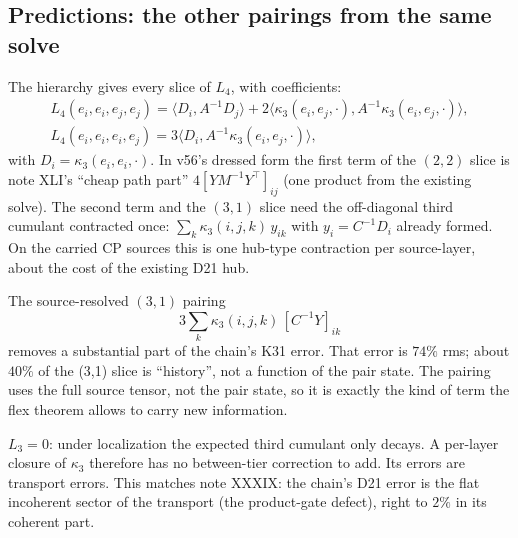 \subsection{Predictions: the other pairings from the same solve}
The hierarchy gives every slice of $L_4$, with coefficients:
\begin{gather*}
L_4(e_i,e_i,e_j,e_j)=\langle D_i,A^{-1}D_j\rangle+2\langle\kappa_3(e_i,e_j,\cdot),A^{-1}\kappa_3(e_i,e_j,\cdot)\rangle,\\
L_4(e_i,e_i,e_i,e_j)=3\langle D_i,A^{-1}\kappa_3(e_i,e_j,\cdot)\rangle,
\end{gather*}
with $D_i=\kappa_3(e_i,e_i,\cdot)$. In v56's dressed form the first term of the $(2,2)$ slice is note XLI's ``cheap path part''
$4[YM^{-1}Y^\top]_{ij}$ (one product from the existing solve). The second term and the $(3,1)$ slice need the off-diagonal third cumulant
contracted once: $\sum_k\kappa_3(i,j,k)\,y_{ik}$ with $y_i=C^{-1}D_i$ already formed. On the carried CP sources this is one hub-type
contraction per source-layer, about the cost of the existing D21 hub.
\begin{conjecture}
The source-resolved $(3,1)$ pairing
\[
3\sum_k\kappa_3(i,j,k)\,[C^{-1}Y]_{ik}
\]
removes a substantial part of the chain's K31 error. That
error is $74\%$ rms; about $40\%$ of the (3,1) slice is ``history'', not a function of the pair state. The pairing uses the full source
tensor, not the pair state, so it is exactly the kind of term the flex theorem allows to carry new information.
\end{conjecture}
\begin{remark}
$L_3=0$: under localization the expected third cumulant only decays. A per-layer closure of $\kappa_3$ therefore has no
between-tier correction to add. Its errors are transport errors. This matches note XXXIX: the chain's D21 error is the flat
incoherent sector of the transport (the product-gate defect), right to $2\%$ in its coherent part.
\end{remark}
